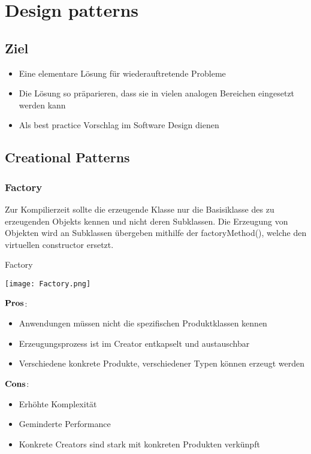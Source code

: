 \section{Design patterns}
\subsection{Ziel}
\begin{itemize}
	\item Eine elementare Lösung für wiederauftretende Probleme
	\item Die Lösung so präparieren, dass sie in vielen analogen Bereichen eingesetzt werden kann
	\item Als best practice Vorschlag im Software Design dienen   
\end{itemize}
\subsection{Creational Patterns}
\subsubsection{Factory}
Zur Kompilierzeit sollte die erzeugende Klasse nur die Basisiklasse des zu erzeugenden Objekts kennen und nicht deren Subklassen. Die Erzeugung von Objekten wird an Subklassen übergeben mithilfe der factoryMethod(), welche den virtuellen constructor ersetzt.
\begin{table}[H]
\caption{Factory}
\texttt{[image: Factory.png]}	
\end{table}
\begin{multicols}{2}
$\bold{Pros}$:
\begin{itemize}
	\item Anwendungen müssen nicht die spezifischen Produktklassen kennen
	\item Erzeugungsprozess ist im Creator entkapselt und austauschbar
	\item Verschiedene konkrete Produkte, verschiedener Typen können erzeugt werden  
\end{itemize}
\columnbreak
$\bold{Cons}$:
\begin{itemize}
	\item Erhöhte Komplexität
	\item Geminderte Performance
	\item Konkrete Creators sind stark mit konkreten Produkten verkünpft
\end{itemize}
\end{multicols}
